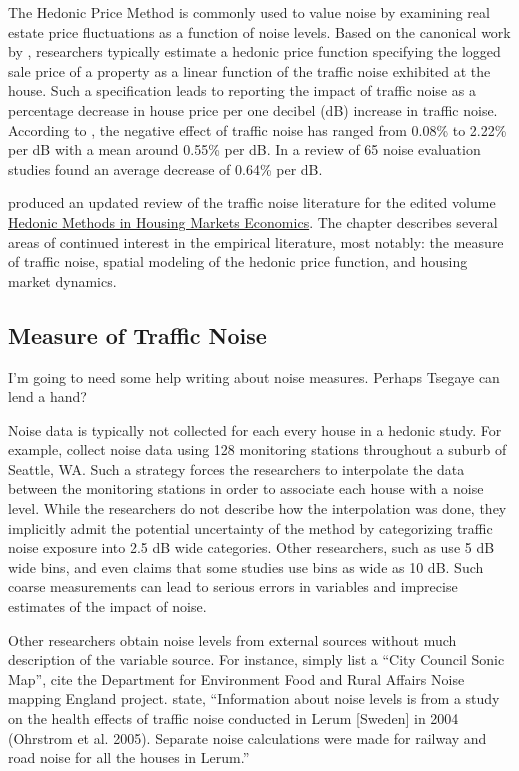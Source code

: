\documentclass{article}\usepackage{graphicx, color}
\begin{document}
The Hedonic Price Method is commonly used to value noise by examining real estate price fluctuations as a function of noise levels. Based on the canonical work by \citet{Rosen1974}, researchers typically estimate a hedonic price function specifying the logged sale price of a property as a linear function of the traffic noise exhibited at the house. Such a specification leads to reporting the impact of traffic noise as a percentage decrease in house price per one decibel (dB) increase in traffic noise. According to \citet{Bateman2001}, the negative effect of traffic noise has ranged from 0.08\% to 2.22\% per dB with a mean around 0.55\% per dB. In a review of 65 noise evaluation studies \citet{Navrud2002} found an average decrease of 0.64\% per dB. 

\citet{Nelson2008} produced an updated review of the traffic noise literature for the edited volume \underline{Hedonic Methods in Housing Markets Economics}. The chapter describes several areas of continued interest in the empirical literature, most notably: the measure of traffic noise, spatial modeling of the hedonic price function, and housing market dynamics.

\subsection{Measure of Traffic Noise}
I'm going to need some help writing about noise measures. Perhaps Tsegaye can lend a hand?

Noise data is typically not collected for each every house in a hedonic study. For example, \citet{Huang;Palmquist2001} collect noise data using 128 monitoring stations throughout a suburb of Seattle, WA. Such a strategy forces the researchers to interpolate the data between the monitoring stations in order to associate each house with a noise level. While the researchers do not describe how the interpolation was done, they implicitly admit the potential uncertainty of the method by categorizing traffic noise exposure into 2.5 dB wide categories. Other researchers, such as \citet{Theebe2004a} use 5 dB wide bins, and \citet{Nelson2008} even claims that some studies use bins as wide as 10 dB. Such coarse measurements can lead to serious errors in variables and imprecise estimates of the impact of noise. 

Other researchers obtain noise levels from external sources without much description of the variable source. For instance, \cite{MarmolejoDuarteCarlos;GonzalezTamez2009} simply list a ``City Council Sonic Map'',  \citet{Blanco2011} cite the Department for Environment Food and Rural Affairs Noise mapping England project. \citet{Andersson2010} state, ``Information about noise levels is from a study on the health effects of traffic noise conducted in Lerum [Sweden] in 2004 (Ohrstrom et al. 2005). Separate noise calculations were made for railway and road noise for all the houses in Lerum.''
\end{document}
